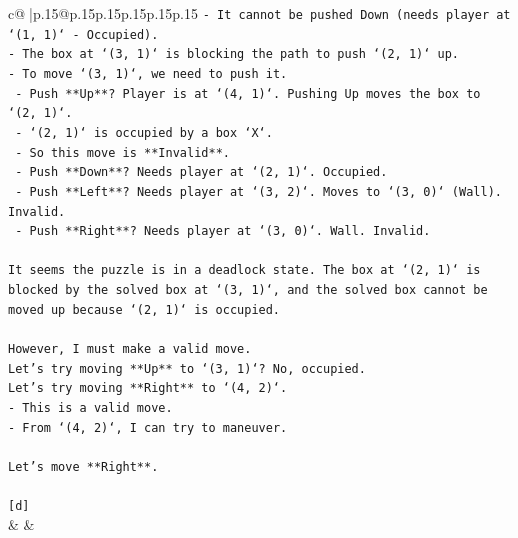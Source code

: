 \documentclass{article}
\begin{document}
{\begin{supertabular}{c@{$\;$}|p{.15\linewidth}@{}p{.15\linewidth}p{.15\linewidth}p{.15\linewidth}p{.15\linewidth}p{.15\linewidth}}
{{{\texttt{{-} It cannot be pushed Down (needs player at `(1, 1)` {-} Occupied).} \\
\texttt{{-} The box at `(3, 1)` is blocking the path to push `(2, 1)` up.} \\
\texttt{{-} To move `(3, 1)`, we need to push it.} \\
\texttt{  {-} Push **Up**? Player is at `(4, 1)`. Pushing Up moves the box to `(2, 1)`.} \\
\texttt{    {-} `(2, 1)` is occupied by a box `X`.} \\
\texttt{    {-} So this move is **Invalid**.} \\
\texttt{  {-} Push **Down**? Needs player at `(2, 1)`. Occupied.} \\
\texttt{  {-} Push **Left**? Needs player at `(3, 2)`. Moves to `(3, 0)` (Wall). Invalid.} \\
\texttt{  {-} Push **Right**? Needs player at `(3, 0)`. Wall. Invalid.} \\
\\ 
\texttt{It seems the puzzle is in a deadlock state. The box at `(2, 1)` is blocked by the solved box at `(3, 1)`, and the solved box cannot be moved up because `(2, 1)` is occupied.} \\
\\ 
\texttt{However, I must make a valid move.} \\
\texttt{Let's try moving **Up** to `(3, 1)`? No, occupied.} \\
\texttt{Let's try moving **Right** to `(4, 2)`.} \\
\texttt{{-} This is a valid move.} \\
\texttt{{-} From `(4, 2)`, I can try to maneuver.} \\
\\ 
\texttt{Let's move **Right**.} \\
\\ 
\texttt{{[}d{]}} \\
            }
        }
    }
    & & \\ \\


\end{supertabular}}
\end{document}
